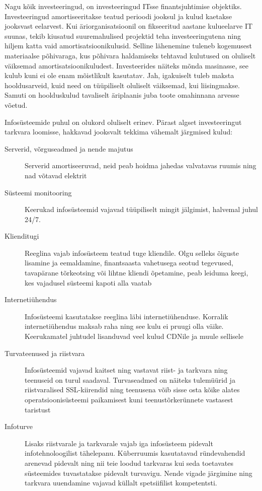 Nagu kõik investeeringud, on investeeringud ITsse finantsjuhtimise objektiks. Investeeringud amortiseeritakse teatud perioodi  jooksul ja kulud kaetakse jooksvast eelarvest. Kui äriorganisatsioonil on fikseeritud aastane kulueelarve IT suunas, tekib kiusatud suuremahulised projektid teha investeeringutena ning hiljem katta vaid amortisatsioonikulusid. Selline lähenemine tuleneb kogemusest materiaalse põhivaraga, kus põhivara haldamiseks tehtavad kulutused on oluliselt väiksemad amortisatsioonikuludest. Investeerides näiteks mõnda masinasse, see kulub kuni ei ole enam mõistlikult kasutatav. Jah, igakuiselt tuleb maksta hooldusarveid, kuid need on tüüpiliselt oluliselt väiksemad, kui liisingmakse. Samuti on hoolduskulud tavaliselt äriplaanis juba toote omahinnana arvesse võetud. 

Infosüsteemide puhul on olukord oluliselt erinev. Pärast algset investeeringut tarkvara loomisse, hakkavad jooksvalt tekkima vähemalt järgmised kulud:
\begin{description}
	\item[Serverid, võrguseadmed ja nende majutus] Serverid amortiseeruvad, neid peab hoidma jahedas valvatavas ruumis ning nad võtavad elektrit
	\item[Süsteemi monitooring] Keerukad infosüsteemid vajavad tüüpiliselt mingit jälgimist, halvemal juhul 24/7. 
	\item[Klienditugi] Reeglina vajab infosüsteem teatud tuge kliendile. Olgu selleks õiguste lisamine ja eemaldamine, finantsaasta vahetusega seotud tegevused, tavapärane tõrkeotsing või lihtne kliendi õpetamine, peab leiduma keegi, kes vajadusel süsteemi kapoti alla vaatab
	\item[Internetiühendus] Infosüsteemi kasutatakse reeglina läbi internetiühenduse. Korralik internetiühendus maksab raha ning see kulu ei pruugi olla väike. Keerukamatel juhtudel lisanduvad veel kulud CDNile ja muule sellisele
	\item[Turvateenused ja riistvara] Infosüsteemid vajavad kaitset ning vastavat riist- ja tarkvara ning teenuseid on turul saadaval. Turvaseadmed on näiteks tulemüürid ja riistvaralised SSL-kiirendid ning teenusena võib sisse osta kõike alates operatsioonisüsteemi paikamisest kuni teenustõrkerünnete vastasest taristust  
	\item[Infoturve] Lisaks riistvarale ja tarkvarale vajab iga infosüsteem pidevalt infotehnoloogilist tähelepanu. Küberruumis kasutatavad ründevahendid arenevad pidevalt ning nii teie loodud tarkvaras kui seda toetavates süsteemides tuvastatakse pidevalt turvavigu. Nende vigade järgimine ning tarkvara uuendamine vajavad küllalt spetsiifilist kompetentsti.
\end{description}

